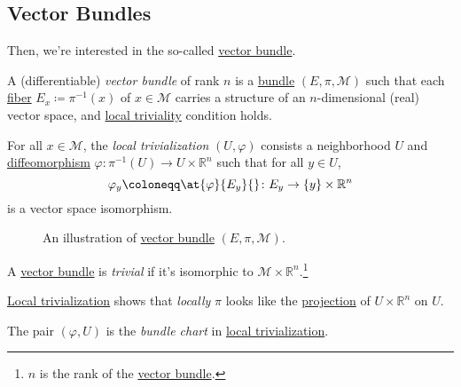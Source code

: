 \subsection{Vector Bundles}
Then, we're interested in the so-called \hyperref[def:vector-bundle]{vector bundle}.

\begin{definition}\label{def:vector-bundle}
	A (differentiable) \emph{vector bundle} of rank \(n\) is a \hyperref[def:bundle]{bundle} \((E, \pi , \mathcal{M} )\) such that each \hyperref[def:fiber]{fiber} \(E_x\coloneqq \pi ^{-1} (x)\) of \(x\in \mathcal{M} \) carries a structure of an \(n\)-dimensional (real) vector space, and \hyperref[def:local-trivialization]{local triviality} condition holds.

	\begin{definition}\label{def:local-trivialization}
		For all \(x\in \mathcal{M} \), the \emph{local trivialization} \((U, \varphi )\) consists a neighborhood \(U\) and \hyperref[def:diffeomorphism]{diffeomorphism} \(\varphi \colon \pi ^{-1} (U) \to U\times \mathbb{R} ^n\) such that for all \(y\in U\),
		\[
			\varphi _y \coloneqq \at{\varphi }{E_y}{} \colon E_y \to \left\{ y \right\} \times \mathbb{R} ^n
		\]
		is a vector space isomorphism.
	\end{definition}
\end{definition}

\begin{figure}[H]
	\centering
	\caption{An illustration of \hyperref[def:vector-bundle]{vector bundle} \((E, \pi , \mathcal{M} )\).}
	\label{fig:vector-bundle}
\end{figure}

\begin{definition}[Trivial]\label{def:trivial}
	A \hyperref[def:vector-bundle]{vector bundle} is \emph{trivial} if it's isomorphic to \(\mathcal{M} \times \mathbb{R} ^n\).\footnote{\(n\) is the rank of the \hyperref[def:vector-bundle]{vector bundle}.}
\end{definition}

\begin{intuition}
	\hyperref[def:local-trivialization]{Local trivialization} shows that \emph{locally} \(\pi \) looks like the \hyperref[def:bundle-projection]{projection} of \(U\times \mathbb{R} ^n\) on \(U\).
\end{intuition}

\begin{definition}\label{def:bundle-chart}
	The pair \((\varphi , U)\) is the \emph{bundle chart} in \hyperref[def:local-trivialization]{local trivialization}.
\end{definition}

